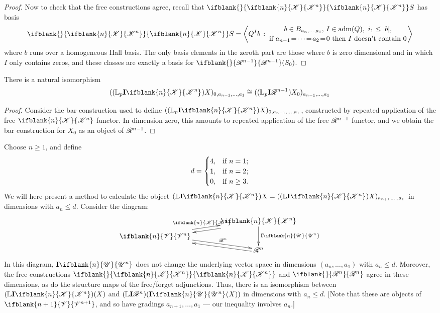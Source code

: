 \documentclass[10pt]{article}
\newcommand{\PRLie}[1]{\scrR^{#1}}%
\newcommand{\LL}[1]{\ifblank{#1}{\scrK}{\scrK^{#1}}}
\newcommand{\GR}[1]{\ifblank{#1}{\scrV}{\scrV^{#1}}}
\newcommand{\nontop}[1]{\ifblank{#1}{\scrU}{\scrU^{#1}}}
\newcommand{\admis}[1]{\mathrm{adm}(#1)}%
\newcommand{\Ind}[2][]{\mathbf{I}{#2}_{#1}}%
\newcommand{\forget}{\mathrm{fg}}
\newcommand{\Fr}[2][]{\ifblank{#1}{#2}{#2_{#1}}}
\newcommand{\derived}{\mathbb{L}}
\renewcommand{\Q}{Q}
\begin{document}
\begin{DerivedFunctorsLowDimension}
\begin{proof}
Now to check that the free constructions agree, recall that  $\Fr{\LL{n}}S$ has basis
\[{\Fr{\LL{n}}S}
=
\left\langle \Q^Ib\,:\,\genfrac{}{}{0pt}{}{b\in B_{a_n,\ldots,a_1},\,I\in\admis{\Q},\ i_1\leq|b|,}{\textup{if }a_{n-1}\!=\!\cdots\!=\!a_2\!=\!0\textup{ then $I$ doesn't contain 0}}\right\rangle\]
where $b$ runs over a homogeneous Hall basis. The only basis elements in the zeroth part are those where $b$ is zero dimensional and in which $I$ only contains zeros, and these classes are exactly a basis for $\Fr{\PRLie{n-1}}(S_0)$.
\end{proof}
\begin{prop}
There is a natural isomorphism
\[((\derived_{p}\Ind{\LL{n}})X)_{0,a_{n-1},\ldots,a_1}\cong ((\derived_p\Ind{\PRLie{n-1}})X_0)_{a_{n-1},\ldots,a_1}\]
\begin{proof}
Consider the bar construction used to define $((\derived_{p}\Ind{\LL{n}})X)_{0,a_{n-1},\ldots,a_1}$, constructed by repeated application of the free ${\LL{n}}$ functor. In dimension zero, this amounts to repeated application of the free $\PRLie{n-1}$ functor, and we obtain the bar construction for $X_0$ as an object of $\PRLie{n-1}$.
\end{proof}
\end{prop}
\begin{shaded}
Choose $n\geq 1$, and define 
\[d=\begin{cases}
4,&\textup{if }n=1;\\
1,&\textup{if }n=2;
\\0,&\textup{if }n\geq3.
\end{cases}
\]
We will here present a method to calculate the object $(\derived\Ind{\LL{n}})X=((\derived\Ind{\LL{n}})X)_{a_{n+1},\ldots,a_1}$ in dimensions with $a_n\leq d$. Consider the diagram:
\[\xymatrix@R=2mm@C=13mm{
&%
\ar[dd]^-{\Ind{\nontop{n}}}
\ar@<.5ex>[dl]%
\LL{n}\\%
\ar@<.5ex>[ur]^-{\LL{n}}
\ar@<.5ex>[dr]^-{\PRLie{n}}
\GR{n}&%
\\%
&%
\PRLie{n}
\ar@<.5ex>[ul]%
}\]
In this diagram, $\Ind{\nontop{n}}$ does not change the underlying vector space in dimensions $(a_n,\ldots,a_1)$ with $a_n\leq d$. Moreover, the free constructions $\Fr{\LL{n}}$ and $\Fr{\PRLie{n}}$ agree in these dimensions, as do the structure maps of the free/forget adjunctions. Thus, there is an isomorphism between $(\derived\Ind{\LL{n}})(X)$ and $(\derived\Ind{\PRLie{n}})(\Ind{\nontop{n}}(X))$ in dimensions with $a_n\leq d$. [Note that these are objects of $\GR{n+1}$, and so have gradings $a_{n+1},\ldots,a_1$ --- our inequality involves $a_n$.] %
\end{shaded}


\end{DerivedFunctorsLowDimension}
\end{document}
